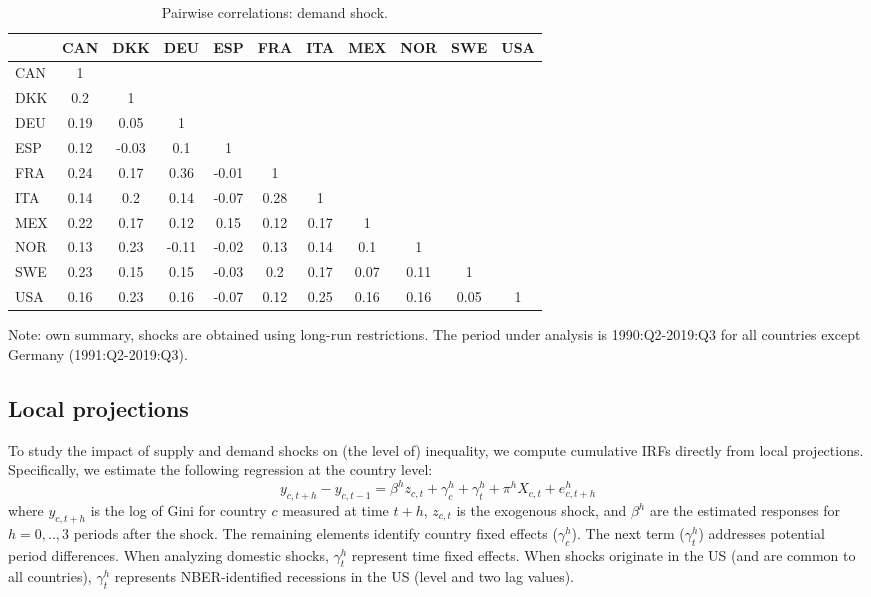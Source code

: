 \documentclass[12pt, a4paper]{article}
\begin{document}
\begin{table}[H]
\captionsetup{justification=raggedright,
singlelinecheck=false
}
    \centering
    \caption{Pairwise correlations: demand shock.}
    \begin{tabular}{l ccc ccc ccc c}
    \toprule
& CAN & DKK & DEU & ESP & FRA & ITA & MEX & NOR & SWE & USA \\ 
  \hline
  CAN & 1 &  &  &  &  &  &  &  &  &  \\ 
  DKK & 0.2 & 1 &  &  &  &  &  &  &  &  \\ 
  DEU & 0.19 & 0.05 & 1 &  &  &  &  &  &  &  \\ 
  ESP & 0.12 & -0.03 & 0.1 & 1 &  &  &  &  &  &  \\ 
  FRA & 0.24 & 0.17 & 0.36 & -0.01 & 1 &  &  &  &  &  \\ 
  ITA & 0.14 & 0.2 & 0.14 & -0.07 & 0.28 & 1 &  &  &  &  \\ 
  MEX & 0.22 & 0.17 & 0.12 & 0.15 & 0.12 & 0.17 & 1 &  &  &  \\ 
  NOR & 0.13 & 0.23 & -0.11 & -0.02 & 0.13 & 0.14 & 0.1 & 1 &  &  \\ 
  SWE & 0.23 & 0.15 & 0.15 & -0.03 & 0.2 & 0.17 & 0.07 & 0.11 & 1 &  \\ 
  USA & 0.16 & 0.23 & 0.16 & -0.07 & 0.12 & 0.25 & 0.16 & 0.16 & 0.05 & 1 \\ 
    \bottomrule
    \end{tabular}
    \begin{minipage}{\textwidth}
    \vspace{0.1cm}
    \footnotesize Note: own summary, shocks are obtained using long-run restrictions. The period under analysis is 1990:Q2-2019:Q3 for all countries except Germany (1991:Q2-2019:Q3).
    \end{minipage}
    \label{table:a3}
\end{table}


\subsection{Local projections} 
To study the impact of supply and demand shocks on (the level of) inequality, we compute cumulative IRFs directly from local projections. Specifically, we estimate the following regression at the country level:
\begin{equation}
    y_{c,t+h}-y_{c,t-1} =  \beta^h z_{c,t} + \gamma^h_c + \gamma^h_t + \pi^h X_{c,t} + e^h_{c, t+h}
\label{eq:1}
\end{equation}
\noindent where $y_{c,t+h}$ is the log of Gini for country $c$ measured at time $t+h$, $z_{c,t}$ is the exogenous shock, and $\beta^h$ are the estimated responses for $h = 0,..,3$ periods after the shock. The remaining elements identify country fixed effects ($\gamma^h_c$). The next term  ($\gamma^h_t$) addresses potential period differences. When analyzing domestic shocks, $\gamma^h_t$ represent time fixed effects. When shocks originate in the US (and are common to all countries), $\gamma^h_t$ represents NBER-identified recessions in the US (level and two lag values).
\end{document}
